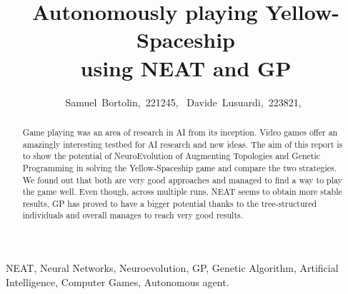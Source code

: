 \documentclass[journal]{IEEEtran}
\begin{document}
%
\title{Autonomously playing Yellow-Spaceship\\using NEAT and GP}
%
%
%

\author{Samuel~Bortolin,~221245,~
        Davide~Lusuardi,~223821,~%
}

%
{}

\maketitle

\begin{abstract}
  Game playing was an area of research in AI from its inception. 
  Video games offer an amazingly interesting testbed for AI research and new ideas. 
  The aim of this report is to show the potential of NeuroEvolution of Augmenting Topologies and Genetic Programming
  in solving the Yellow-Spaceship game and compare the two strategies. 
  We found out that both are very good approaches and managed to find a way to play the game well. 
  Even though, across multiple runs, NEAT seems to obtain more stable results, GP has proved to have 
  a bigger potential thanks to the tree-structured individuals and overall manages to reach very good results.
\end{abstract}

\begin{IEEEkeywords}
NEAT, Neural Networks, Neuroevolution, GP, Genetic Algorithm, Artificial Intelligence, Computer Games, Autonomous agent.
\end{IEEEkeywords}
\end{document}
